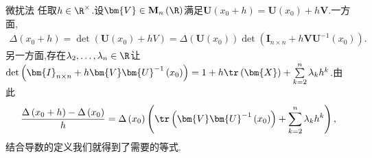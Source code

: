 \begin{sketch}{微扰法}{}
	任取$h\in\R^{\times}$.设$\bm{V}\in\mathbf{M}_{n}\left(\R\right)$满足$\bm{U}\left(x_{0}+h\right)=\bm{U}\left(x_{0}\right)+h\bm{V}$.一方面,
	\begin{align*}
		\Delta\left(x_{0}+h\right)=\det\left(\bm{U}\left(x_{0}\right)+hV\right)=\Delta\left(\bm{U}\left(x_{0}\right)\right)\det\left(\bm{I}_{n\times n}+h\bm{V}\bm{U}^{-1}\left(x_{0}\right)\right).
	\end{align*}
	另一方面,存在$\lambda_{2},\ldots,\lambda_{n}\in\R$让$\det\left(\bm{I}_{n\times n}+h\bm{V}\bm{U}^{-1}\left(x_{0}\right)\right)=1+h\tr\left(\bm{X}\right)+\sum\limits_{k=2}^{n}\lambda_{k}h^{k}$.由此
	\begin{align*}
		\frac{\Delta\left(x_{0}+h\right)-\Delta\left(x_{0}\right)}{h}=\Delta\left(x_{0}\right)\left(\tr\left(\bm{V}\bm{U}^{-1}\left(x_{0}\right)\right)+\sum\limits_{k=2}^{n}\lambda_{k}h^{k}\right),
	\end{align*}
	结合导数的定义我们就得到了需要的等式.
\end{sketch}































